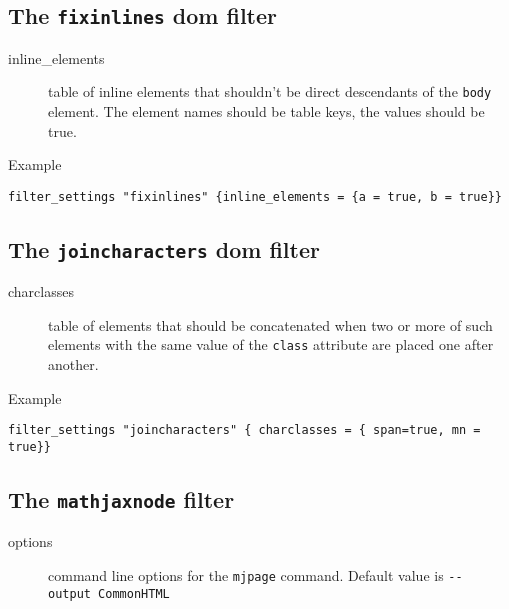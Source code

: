 \hypertarget{the-fixinlines-dom-filter}{%
\subsection{\texorpdfstring{The \texttt{fixinlines} dom
filter}{The fixinlines dom filter}}\label{the-fixinlines-dom-filter}}

\begin{description}
\item[inline\_elements]
table of inline elements that shouldn't be direct descendants of the
\texttt{body} element. The element names should be table keys, the
values should be true.
\end{description}

Example

\begin{verbatim}
filter_settings "fixinlines" {inline_elements = {a = true, b = true}}
\end{verbatim}

\hypertarget{the-joincharacters-dom-filter}{%
\subsection{\texorpdfstring{The \texttt{joincharacters} dom
filter}{The joincharacters dom filter}}\label{the-joincharacters-dom-filter}}

\begin{description}
\item[charclasses]
table of elements that should be concatenated when two or more of such
elements with the same value of the \texttt{class} attribute are placed
one after another.
\end{description}

Example

\begin{verbatim}
filter_settings "joincharacters" { charclasses = { span=true, mn = true}}
\end{verbatim}

\hypertarget{mathjaxsettings}{%
\subsection{\texorpdfstring{The \texttt{mathjaxnode}
filter}{The mathjaxnode filter}}\label{mathjaxsettings}}

\begin{description}
\item[options]
command line options for the \texttt{mjpage} command. Default value is
\texttt{-\/-output\ CommonHTML}
\end{description}

